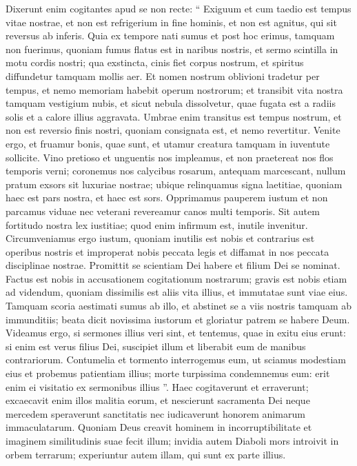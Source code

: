 \begin{biblechapter}
\begin{biblechapter}
\verse Dixerunt enim cogitantes apud se non recte:
 “ Exiguum et cum taedio est tempus vitae nostrae,
 et non est refrigerium in fine hominis,
 et non est agnitus, qui sit reversus ab inferis.
 \verse Quia ex tempore nati sumus
 et post hoc erimus, tamquam non fuerimus,
 quoniam fumus flatus est in naribus nostris,
 et sermo scintilla in motu cordis nostri;
 \verse qua exstincta, cinis fiet corpus nostrum,
 et spiritus diffundetur tamquam mollis aer.
 \verse Et nomen nostrum oblivioni tradetur per tempus,
 et nemo memoriam habebit operum nostrorum;
 et transibit vita nostra tamquam vestigium nubis,
 et sicut nebula dissolvetur,
 quae fugata est a radiis solis
 et a calore illius aggravata.
 \verse Umbrae enim transitus est tempus nostrum,
 et non est reversio finis nostri,
 quoniam consignata est, et nemo revertitur.
 \verse Venite ergo, et fruamur bonis, quae sunt,
 et utamur creatura tamquam in iuventute sollicite.
 \verse Vino pretioso et unguentis nos impleamus,
 et non praetereat nos flos temporis verni;
 \verse coronemus nos calycibus rosarum, antequam marcescant,
 \verse nullum pratum exsors sit luxuriae nostrae;
 ubique relinquamus signa laetitiae,
 quoniam haec est pars nostra, et haec est sors.
 \verse Opprimamus pauperem iustum
 et non parcamus viduae
 nec veterani revereamur canos multi temporis.
 \verse Sit autem fortitudo nostra lex iustitiae;
 quod enim infirmum est, inutile invenitur.
 \verse Circumveniamus ergo iustum, quoniam inutilis est nobis
 et contrarius est operibus nostris
 et improperat nobis peccata legis
 et diffamat in nos peccata disciplinae nostrae.
 \verse Promittit se scientiam Dei habere
 et filium Dei se nominat.
 \verse Factus est nobis in accusationem cogitationum nostrarum;
 gravis est nobis etiam ad videndum,
 \verse quoniam dissimilis est aliis vita illius,
 et immutatae sunt viae eius.
 \verse Tamquam scoria aestimati sumus ab illo,
 et abstinet se a viis nostris tamquam ab immunditiis;
 beata dicit novissima iustorum
 et gloriatur patrem se habere Deum.
 \verse Videamus ergo, si sermones illius veri sint,
 et tentemus, quae in exitu eius erunt:
 \verse si enim est verus filius Dei, suscipiet illum
 et liberabit eum de manibus contrariorum.
 \verse Contumelia et tormento interrogemus eum,
 ut sciamus modestiam eius
 et probemus patientiam illius;
 \verse morte turpissima condemnemus eum:
 erit enim ei visitatio ex sermonibus illius ”.
 \verse Haec cogitaverunt et erraverunt;
 excaecavit enim illos malitia eorum,
 \verse et nescierunt sacramenta Dei
 neque mercedem speraverunt sanctitatis
 nec iudicaverunt honorem animarum immaculatarum.
 \verse Quoniam Deus creavit hominem in incorruptibilitate
 et imaginem similitudinis suae fecit illum;
 \verse invidia autem Diaboli mors introivit in orbem terrarum;
 experiuntur autem illam, qui sunt ex parte illius.
 

\end{biblechapter}
\end{biblechapter}
